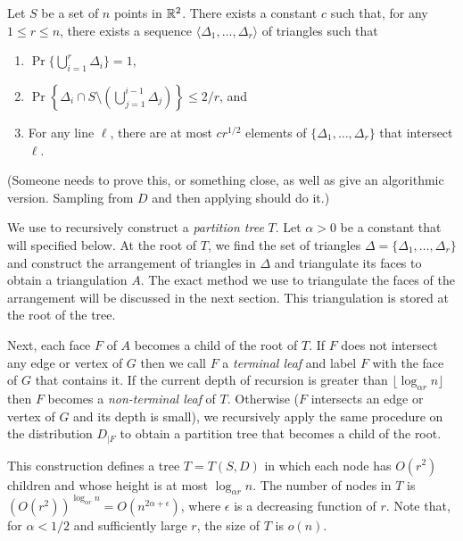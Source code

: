 \documentclass{patmorin}
\begin{document}
\begin{thm}
Let $S$ be a set of $n$ points in $\mathbb{R}^2$. There exists a constant
$c$ such that, for any $1\le r \le n$, there exists a sequence
$\langle \Delta_1,\ldots,\Delta_r\rangle$ of triangles such that
  \begin{enumerate}
    \item $\Pr\{\bigcup_{i=1}^r \Delta_i\} = 1$,
  
    \item $\Pr\left\{\Delta_i \cap S\setminus
    \left(\bigcup_{j=1}^{i-1}\Delta_j\right)\right\} \le 2/r$, and
  
    \item For any line $\ell$, there are at most $cr^{1/2}$ elements of
    $\{\Delta_1,\ldots,\Delta_r\}$ that intersect $\ell$.
  \end{enumerate}
\end{thm}

(Someone needs to prove this, or something close, as well as give an
algorithmic version.  Sampling from $D$ and then applying
 should do it.)

We use  to recursively construct a
\emph{partition tree} $T$.  Let $\alpha > 0$ be a constant that will
specified below.  At the root of $T$, we find the set of triangles
$\Delta=\{\Delta_1,\ldots,\Delta_r\}$ and construct the arrangement of
triangles in $\Delta$ and triangulate its faces to obtain a triangulation
$A$. The exact method we use to triangulate the faces of the arrangement
will be discussed in the next section.  This triangulation is stored at
the root of the tree.

Next, each face $F$ of $A$ becomes a child of the root of $T$.  If $F$
does not intersect any edge or vertex of $G$ then we call $F$ a
\emph{terminal leaf} and label $F$ with the face of $G$ that contains it.
If the current depth of recursion is greater than $\lfloor\log_{\alpha r}
n\rfloor$ then $F$ becomes a \emph{non-terminal leaf} of $T$.  Otherwise
($F$ intersects an edge or vertex of $G$ and its depth is small),
we recursively apply the same procedure on the distribution $D_{|F}$
to obtain a partition tree that becomes a child of the root.

This construction defines a tree $T=T(S,D)$ in which each node has
$O(r^2)$ children and whose height is at most $\log_{\alpha r} n$.
The number of nodes in $T$ is $(O(r^2))^{\log_{\alpha r} n} =
O(n^{2\alpha+\epsilon})$, where $\epsilon$ is a decreasing function
of $r$.  Note that, for $\alpha < 1/2$ and sufficiently large $r$,
the size of $T$ is $o(n)$.
\end{document}
